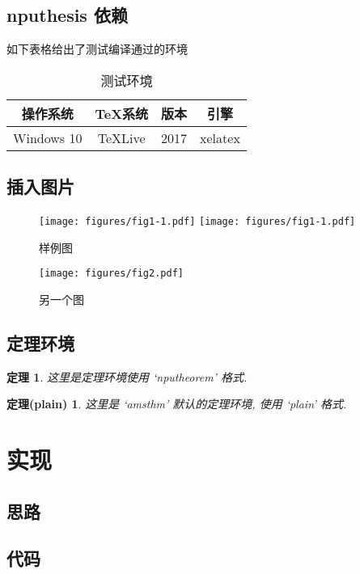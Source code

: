 \documentclass[twoside, workbib, UTF8, phd, workbib=biblatex]{nputhesis}
\newtheorem{thm}{定理}[section]
\theoremstyle{plain}
\newtheorem{plain-thm}{定理(plain)}[section]
\begin{document}
\section{nputhesis 依赖}
如下表格给出了测试编译通过的环境
\begin{table}[h]
  \caption{测试环境\cite{Liu2013}}
  \centering
  \begin{tabular}{cccc}
    \toprule
    操作系统    & \TeX 系统   & 版本  & 引擎\\
    \midrule
    Windows 10  & TeXLive     & 2017  & xelatex\\
    \bottomrule
  \end{tabular}
\end{table}

\section{插入图片}
\lipsum[1-3]
\begin{figure}
    \centering
    \texttt{[image: figures/fig1-1.pdf]}
    \texttt{[image: figures/fig1-1.pdf]}
    \caption{样例图}
\end{figure}
\begin{figure}
    \centering
    \texttt{[image: figures/fig2.pdf]}
    \caption{另一个图}
\end{figure}
\lipsum[4-6]
\section{定理环境}
\lipsum[1]
\begin{thm}
    这里是定理环境使用 `nputheorem' 格式.
\end{thm}
\lipsum[2]
\begin{plain-thm}
    这里是 `amsthm' 默认的定理环境, 使用 `plain' 格式.
\end{plain-thm}
\lipsum[3]

\chapter{实现}
\section{思路}
\section{代码}
\nocite{A2016, B2017, C2018, D2019}
\backmatter
\npuchoosebib{%
  \printbibliography             %
}{%
}
\Appendix  %
\end{document}
